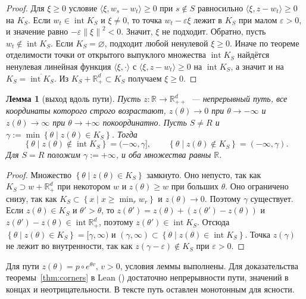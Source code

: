 \documentclass[a4paper,11pt]{article}
\newcommand{\lean}[1]{\mbox{\path{#1}}} %
\theoremstyle{plain}
\newtheorem{lemma}[theorem]{Лемма}
\theoremstyle{definition}
\theoremstyle{remark}
\newcommand{\R}{\mathbb{R}}
\newcommand{\norm}[1]{\left\lVert #1 \right\rVert}
\newcommand{\set}[1]{\left\{ #1 \right\}}
\newcommand{\ip}[2]{\langle #1, #2\rangle} %
\newcommand{\Rpp}[1][2]{\R^{#1}_{++}} %
\newcommand{\Rp}[1][2]{\R^{#1}_{+}}   %
\DeclareMathOperator{\interior}{int}
\begin{document}
\begin{proof}
    Для $\xi\ge0$ условие $\ip{\xi}{w_s-w_t}\ge0$ при $s\notin S$ равносильно $\ip{\xi}{z-w_t}\ge0$ на $K_S$. Если $w_t\in\interior K_S$ и $\xi\ne0$, то точка $w_t-\varepsilon\xi$ лежит в $K_S$ при малом $\varepsilon>0$, и значение равно $-\varepsilon\norm{\xi}^2<0$. Значит, $\xi$ не подходит. Обратно, пусть $w_t\notin\interior K_S$. Если $K_S=\varnothing$, подходит любой ненулевой $\xi\ge0$. Иначе по теореме отделимости точки от открытого выпуклого множества $\interior K_S$ найдётся ненулевая линейная функция $\ip{\xi}{\cdot}$ с $\ip{\xi}{z-w_t}\ge0$ на $\interior K_S$, а значит и на $K_S=\overline{\interior K_S}$. Из $K_S+\Rp[d]\subset K_S$ получаем $\xi\ge0$.
\end{proof}

\begin{lemma}[выход вдоль пути]\label{lem:ray}
    Пусть $z:\R\to\Rpp[d]$~--- непрерывный путь, все координаты которого строго возрастают, $z(\theta)\to0$ при $\theta\to-\infty$ и $z(\theta)\to\infty$ при $\theta\to+\infty$ покоординатно. Пусть $S\ne R$ и $\gamma:=\min\set{\theta\mid z(\theta)\in K_S}$. Тогда
    \[
        \set{\theta\mid z(\theta)\notin\interior K_S}=(-\infty,\gamma],\qquad\set{\theta\mid z(\theta)\notin K_S}=(-\infty,\gamma).
    \]
    Для $S=R$ положим $\gamma:=+\infty$, и оба множества равны $\R$.
\end{lemma}

\begin{proof}
    Множество $\set{\theta\mid z(\theta)\in K_S}$ замкнуто. Оно непусто, так как $K_S\supset w+\Rp[d]$ при некотором $w$ и $z(\theta)\ge w$ при больших $\theta$. Оно ограничено снизу, так как $K_S\subset\set{x\mid x\ge\min_rw_r}$ и $z(\theta)\to0$. Поэтому $\gamma$ существует. Если $z(\theta)\in K_S$ и $\theta'>\theta$, то $z(\theta')=z(\theta)+(z(\theta')-z(\theta))$ и $z(\theta')-z(\theta)\in\interior\Rp[d]$, поэтому $z(\theta')\in\interior K_S$. Отсюда $\set{\theta\mid z(\theta)\in K_S}=[\gamma,\infty)$ и $(\gamma,\infty)\subset\set{\theta\mid z(\theta)\in\interior K_S}$. Точка $z(\gamma)$ не лежит во внутренности, так как $z(\gamma-\varepsilon)\notin K_S$ при $\varepsilon>0$.
\end{proof}

Для пути $z(\theta)=p\circ e^{\theta v}$, $v>0$, условия леммы выполнены. Для доказательства теоремы~\ref{thm:corners} в Lean (\lean{path_of_corners}) достаточно непрерывности пути, значений в концах и неотрицательности. В тексте путь оставлен монотонным для ясности.
\end{document}
